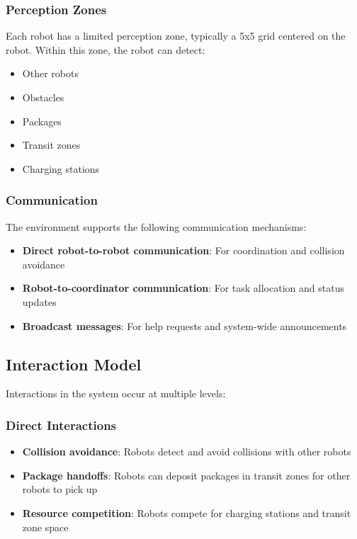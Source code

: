 \documentclass[12pt,a4paper]{article}
\begin{document}
\subsubsection{Perception Zones}
Each robot has a limited perception zone, typically a 5x5 grid centered on the robot. Within this zone, the robot can detect:
\begin{itemize}
    \item Other robots
    \item Obstacles
    \item Packages
    \item Transit zones
    \item Charging stations
\end{itemize}

\subsubsection{Communication}
The environment supports the following communication mechanisms:
\begin{itemize}
    \item \textbf{Direct robot-to-robot communication}: For coordination and collision avoidance
    \item \textbf{Robot-to-coordinator communication}: For task allocation and status updates
    \item \textbf{Broadcast messages}: For help requests and system-wide announcements
\end{itemize}

\subsection{Interaction Model}
Interactions in the system occur at multiple levels:

\subsubsection{Direct Interactions}
\begin{itemize}
    \item \textbf{Collision avoidance}: Robots detect and avoid collisions with other robots
    \item \textbf{Package handoffs}: Robots can deposit packages in transit zones for other robots to pick up
    \item \textbf{Resource competition}: Robots compete for charging stations and transit zone space
\end{itemize}
\end{document}

